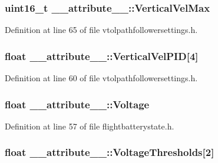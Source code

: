 \hypertarget{struct____attribute_____af2f30e88440c480a0444e4f7f5671d11}{
\subsubsection[{\-Vertical\-Vel\-Max}]{\setlength{\rightskip}{0pt plus 5cm}uint16\-\_\-t {\bf \-\_\-\-\_\-attribute\-\_\-\-\_\-\-::\-Vertical\-Vel\-Max}}}\label{struct____attribute_____af2f30e88440c480a0444e4f7f5671d11}


\-Definition at line 65 of file vtolpathfollowersettings.\-h.

\hypertarget{struct____attribute_____aa633dd07f6e1c5b17ed7ccc9dd5645a7}{
\subsubsection[{\-Vertical\-Vel\-P\-I\-D}]{\setlength{\rightskip}{0pt plus 5cm}float {\bf \-\_\-\-\_\-attribute\-\_\-\-\_\-\-::\-Vertical\-Vel\-P\-I\-D}\mbox{[}4\mbox{]}}}\label{struct____attribute_____aa633dd07f6e1c5b17ed7ccc9dd5645a7}


\-Definition at line 60 of file vtolpathfollowersettings.\-h.

\hypertarget{struct____attribute_____a3640543e67ae2225c506d33f6875dd71}{
\subsubsection[{\-Voltage}]{\setlength{\rightskip}{0pt plus 5cm}float {\bf \-\_\-\-\_\-attribute\-\_\-\-\_\-\-::\-Voltage}}}\label{struct____attribute_____a3640543e67ae2225c506d33f6875dd71}


\-Definition at line 57 of file flightbatterystate.\-h.

\hypertarget{struct____attribute_____a573b73033592ad882de1a30219a4960d}{
\subsubsection[{\-Voltage\-Thresholds}]{\setlength{\rightskip}{0pt plus 5cm}float {\bf \-\_\-\-\_\-attribute\-\_\-\-\_\-\-::\-Voltage\-Thresholds}\mbox{[}2\mbox{]}}}\label{struct____attribute_____a573b73033592ad882de1a30219a4960d}


